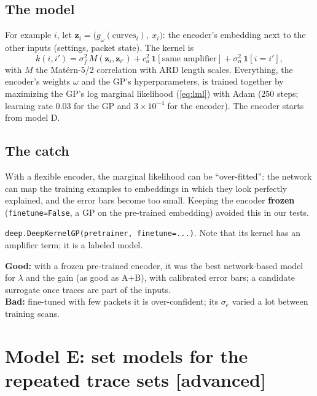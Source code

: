 \documentclass[11pt]{article}
\newcommand{\code}[1]{\texttt{#1}}
\newcommand{\level}[1]{\hfill{\normalfont\small\color{black!60}[#1]}}
\newcommand{\ind}{\mathbf{1}}
\begin{document}
\subsection{The model}
For example $i$, let $\bm z_i = \bigl(g_\omega(\text{curves}_i),\ x_i\bigr)$: the encoder's embedding next to the other inputs
(settings, packet state). The kernel is
\begin{equation}
k(i, i') = \sigma_f^2\,M(\bm z_i, \bm z_{i'}) + c_a^2\,\ind[\text{same amplifier}] + \sigma_n^2\,\ind[i = i'],
\end{equation}
with $M$ the Mat\'ern-5/2 correlation with ARD length scales. Everything, the encoder's weights $\omega$ and the GP's
hyperparameters, is trained together by maximizing the GP's log marginal likelihood (\ref{eq:lml}) with Adam (250 steps; learning
rate 0.03 for the GP and $3\times10^{-4}$ for the encoder). The encoder starts from model D.

\subsection{The catch}
With a flexible encoder, the marginal likelihood can be ``over-fitted'': the network can map the training examples to embeddings in
which they look perfectly explained, and the error bars become too small. Keeping the encoder \textbf{frozen} (\code{finetune=False},
a GP on the pre-trained embedding) avoided this in our tests.

\begin{ours}
\code{deep.DeepKernelGP(pretrainer, finetune=...)}. Note that its kernel has an amplifier term; it is a labeled model.
\end{ours}

\begin{when}
\textbf{Good:} with a frozen pre-trained encoder, it was the best network-based model for $\lambda$ and the gain (as good as A+B), with
calibrated error bars; a candidate surrogate once traces are part of the inputs.\\
\textbf{Bad:} fine-tuned with few packets it is over-confident; its $\sigma_e$ varied a lot between training scans.
\end{when}

\section{Model E: set models for the repeated trace sets \level{advanced}}
\label{sec:sets}
\end{document}
